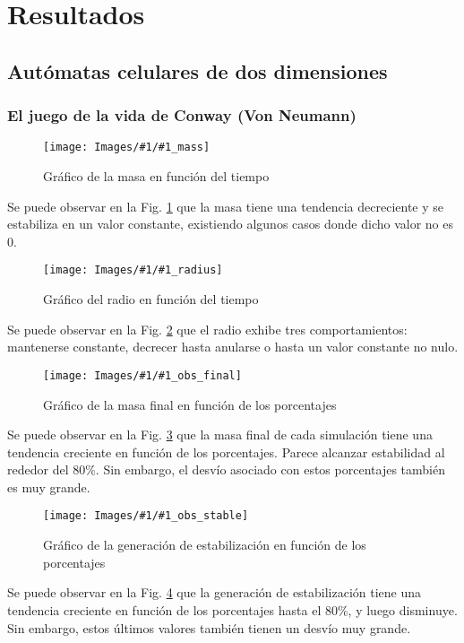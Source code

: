 \newcommand{\massgraph}[1]{
    \begin{figure}[H]
        \centering
        \texttt{[image: Images/\#1/\#1\_mass]}
        \caption{Gráfico de la masa en función del tiempo}
        \label{fig:#1mass}
    \end{figure}
}

\newcommand{\radiusgraph}[1]{
    \begin{figure}[H]
        \centering
        \texttt{[image: Images/\#1/\#1\_radius]}
        \caption{Gráfico del radio en función del tiempo}
        \label{fig:#1radius}
    \end{figure}
}

\newcommand{\obsfinalgraph}[1]{
    \begin{figure}[H]
        \centering
        \texttt{[image: Images/\#1/\#1\_obs\_final]}
        \caption{Gráfico de la masa final en función de los porcentajes}
        \label{fig:#1obsfinal}
    \end{figure}
}

\newcommand{\obsstablegraph}[1]{
    \begin{figure}[H]
        \centering
        \texttt{[image: Images/\#1/\#1\_obs\_stable]}
        \caption{Gráfico de la generación de estabilización en función de los porcentajes}
        \label{fig:#1obsstable}
    \end{figure}
}

\section{Resultados}
\label{sec:resultados}

\subsection{Autómatas celulares de dos dimensiones}
\label{subsec:results2d}
\subsubsection{El juego de la vida de Conway (Von Neumann)}
\massgraph{gol2Dv2}
Se puede observar en la Fig. \ref{fig:gol2Dv2mass} que la masa tiene una tendencia decreciente y se estabiliza en un valor constante, existiendo algunos casos donde dicho valor no es $0$.
\radiusgraph{gol2Dv2}
Se puede observar en la Fig. \ref{fig:gol2Dv2radius} que el radio exhibe tres comportamientos: mantenerse constante, decrecer hasta anularse o hasta un valor constante no nulo.
\obsfinalgraph{gol2Dv2}
Se puede observar en la Fig. \ref{fig:gol2Dv2obsfinal} que la masa final de cada simulación tiene una tendencia creciente en función de los porcentajes. Parece alcanzar estabilidad al rededor del 80\%.
Sin embargo, el desvío asociado con estos porcentajes también es muy grande.
\obsstablegraph{gol2Dv2}
Se puede observar en la Fig. \ref{fig:gol2Dv2obsstable} que la generación de estabilización tiene una tendencia creciente en función de los porcentajes hasta el 80\%, y luego disminuye.
Sin embargo, estos últimos valores también tienen un desvío muy grande.


